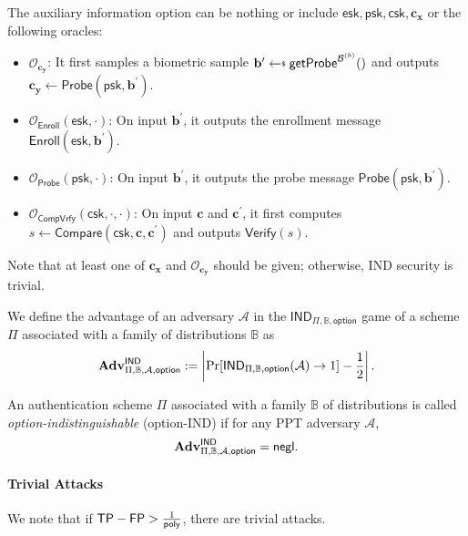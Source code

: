 The auxiliary information \textsf{option} can be nothing or include $\textsf{esk}, \textsf{psk}, \textsf{csk}, \mathbf{c_x} $ or the following oracles:

\begin{itemize}

	\item $\mathcal{O}_{\mathbf{c_y}}$: It first samples a biometric sample $\mathbf{b}^{\prime} \getsdollar \textsf{getProbe}^{\mathcal{B}^{(b)} }()$ and outputs $\mathbf{c_y} \gets \textsf{Probe}(\textsf{psk}, \mathbf{b}^{\prime})$.

	\item $\mathcal{O}_\textsf{Enroll}(\textsf{esk}, \cdot)$: On input $\mathbf{b}^\prime$, it outputs the enrollment message $\textsf{Enroll}(\textsf{esk}, \mathbf{b}^\prime)$.

	\item $\mathcal{O}_\textsf{Probe}(\textsf{psk}, \cdot)$: On input $\mathbf{b}^\prime$, it outputs the probe message $\textsf{Probe}(\textsf{psk}, \mathbf{b}^\prime)$.
	
	\item $\mathcal{O}_\textsf{CompVrfy}(\textsf{csk}, \cdot, \cdot)$: On input $\mathbf{c}$ and $\mathbf{c}^\prime$, it first computes $s \gets \textsf{Compare}(\textsf{csk}, \mathbf{c}, \mathbf{c}^\prime)$ and outputs $\textsf{Verify}(s)$.
\end{itemize}

\noindent Note that at least one of $\mathbf{c_x}$ and $\mathcal{O}_{\mathbf{c_y}}$ should be given; otherwise, IND security is trivial.

We define the advantage of an adversary $\mathcal{A}$ in the $\textsf{IND}_{\Pi, \mathbb{B}, \textsf{option}}$ game of a scheme $\Pi$ associated with a family of distributions $\mathbb{B}$ as
\[
	\mathbf{Adv}^{\textsf{IND}}_{\Pi, \mathbb{B}, \mathcal{A}, \textsf{option}} := \left |\Pr[\textsf{IND}_{\Pi, \mathbb{B}, \textsf{option}}(\mathcal{A}) \to 1] - \frac{1}{2} \right|.
\]

An authentication scheme $\Pi$ associated with a family $\mathbb{B}$ of distributions is called \emph{\textsf{option}-indistinguishable} (\textsf{option}-IND) if for any PPT adversary $\mathcal{A}$,
\[
	\mathbf{Adv}^{\textsf{IND}}_{\Pi, \mathbb{B}, \mathcal{A}, \textsf{option}} = \mathsf{negl}.
\]


\paragraph{Trivial Attacks}
We note that if $\textsf{TP} - \textsf{FP} > \frac{1}{\mathsf{poly}}$, there are trivial attacks.

